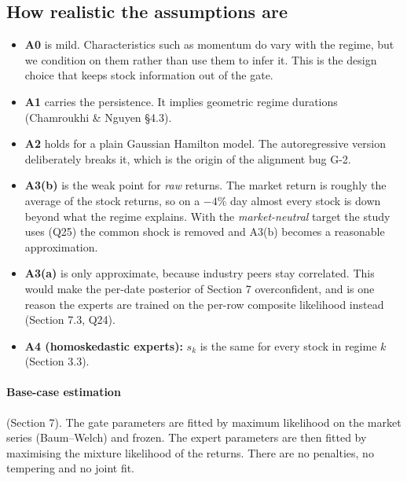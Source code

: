 \subsection{How realistic the assumptions are}
\begin{itemize}
  \item \textbf{A0} is mild. Characteristics such as momentum do vary with the regime, but we condition on them rather than use them to infer it. This is the design choice that keeps stock information out of the gate.
  \item \textbf{A1} carries the persistence. It implies geometric regime durations (Chamroukhi \& Nguyen \S4.3).
  \item \textbf{A2} holds for a plain Gaussian Hamilton model. The autoregressive version deliberately breaks it, which is the origin of the alignment bug G-2.
  \item \textbf{A3(b)} is the weak point for \emph{raw} returns. The market return is roughly the average of the stock returns, so on a $-4\%$ day almost every stock is down beyond what the regime explains. With the \emph{market-neutral} target the study uses (Q25) the common shock is removed and A3(b) becomes a reasonable approximation.
  \item \textbf{A3(a)} is only approximate, because industry peers stay correlated. This would make the per-date posterior of Section 7 overconfident, and is one reason the experts are trained on the per-row composite likelihood instead (Section 7.3, Q24).
  \item \textbf{A4 (homoskedastic experts):} $s_k$ is the same for every stock in regime $k$ (Section 3.3).
\end{itemize}

\paragraph{Base-case estimation} (Section 7). The gate parameters are fitted by maximum likelihood on the market series (Baum--Welch) and frozen. The expert parameters are then fitted by maximising the mixture likelihood of the returns. There are no penalties, no tempering and no joint fit.
\newpage
